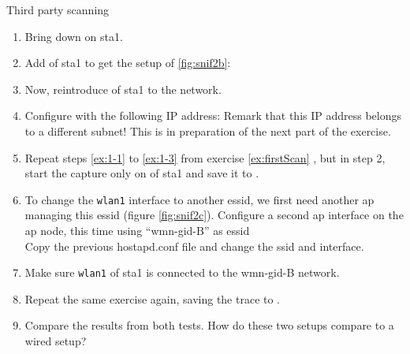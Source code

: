 \begin{exercise}{Third party scanning}
	\begin{enumerate}
		\item Bring  down on \ac{sta}1.\newline
		\item Add  of \ac{sta}1 to get the setup of \ref{fig:snif2b}: \newline
		\item Now, reintroduce  of \ac{sta}1 to the network.\newline
		\item Configure  with the following IP address:\newline
		\remark Remark that this IP address belongs to a different subnet! This is in preparation of the next part of the exercise.
		\item Repeat steps \ref{ex:1-1} to \ref{ex:1-3} from exercise \ref{ex:firstScan} , but in step 2, start the capture only on  of \ac{sta}1 and save it to .
		\item To change the \verb!wlan1! interface to another \ac{essid}, we first need another \ac{ap} managing this \ac{essid} (figure \ref{fig:snif2c}). Configure a second \ac{ap} interface on the \ac{ap} node, this time using ``\ac{wmn}-\ac{gid}-B'' as essid\\
		\remark Copy the previous hostapd.conf file and change the ssid and interface.
		\item Make sure \verb!wlan1! of \ac{sta}1 is connected to the \ac{wmn}-\ac{gid}-B network.
		\item Repeat the same exercise again, saving the trace to . \newline
		\item Compare the results from both tests. How do these two setups compare to a wired setup?\newline
		\begin{esolution}
		\end{esolution}
	\end{enumerate}
	
\end{exercise}


